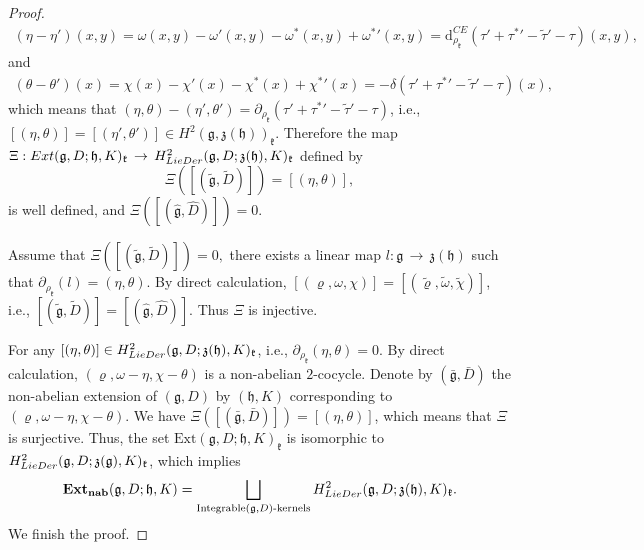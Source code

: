 \documentclass[10pt,a4paper]{amsart}
\newcommand {\emptycomment}[1]{}
\newcommand{\LD}{{\rm LieDer }}
\newcommand{\dM}{\mathrm{d}}
\newcommand{\frkk}{\mathfrak k}
\newcommand{\frkz}{\mathfrak z}
\newcommand{\g}{\mathfrak g}
\newcommand{\h}{\mathfrak h}
\newcommand{\lon }{\,\rightarrow\,}
\begin{document}
\begin{proof}
\begin{eqnarray*}
(\eta-\eta')(x, y)=\omega(x, y)-\omega'(x, y)-\omega^{*}(x, y)+\omega^{*}{'}(x, y) =\dM^{CE}_{\rho_\frkk}(\tau'+\tau^{*}{'}-\tilde{\tau}{'}-\tau)(x, y),
\end{eqnarray*}
and 
\begin{eqnarray*}
(\theta-\theta')(x)=\chi(x)-\chi'(x)-\chi^*(x)+\chi^{*}{'}(x)=-\delta(\tau'+\tau^{*}{'}-\tilde{\tau}'-\tau)(x),
\end{eqnarray*}
which means that $(\eta, \theta)-(\eta', \theta')=\partial_{\rho_{\frkk}}(\tau'+\tau^{*}{'}-\tilde{\tau}'-\tau)$, i.e.,$[(\eta, \theta)]=[(\eta', \theta')]\in H^{2}(\g, \frkz(\h))_{\frkk}$. Therefore the map  
$\Xi:{\rm Ext}(\g,D; \h, K)_\frkk\lon H_{\LD}^{2}(\g,D; \frkz(\h),K)_\frkk$ defined by
$$
\Xi([(\tilde{\g}, \tilde{D})])=[(\eta, \theta)], 
$$
is well defined, and $\Xi([(\hat{\g}, \hat{D})])=0$.

Assume that $\Xi([(\tilde{\g}, \tilde{D})])=0,$ there exists a linear map $l:\g\lon\frkz(\h)$ such that $\partial_{\rho_{\frkk}}(l)=(\eta, \theta)$. By direct calculation, 
\emptycomment{
	Then
\begin{eqnarray*}
\left\{\begin{array}{rcl}
\varrho(x)u-\tilde{\varrho}(x)u&=&[\tau(x)+l(x), u]_\h,\\
\omega(x, y)-\tilde{\omega}(x, y)&=&\tilde{\varrho}(x)(\tau+l)(y)-\tilde{\varrho}(y)(\tau+l)(x)+[(\tau+l)(x), (\tau+l)(y)]_\h-(l+\tau)([x, y]_\g),\\
\chi(x)-\tilde{\chi}(x)&=&K((\tau+l)(x))-(\tau+l)(D(x)),
\end{array}\right.
\end{eqnarray*}
which means that }$[(\varrho, \omega, \chi)]=[(\tilde{\varrho}, \tilde{\omega}, \tilde{\chi})]$, i.e., $[(\tilde{\g}, \tilde{D})]=[(\hat{\g}, \hat{D})]$. Thus $\Xi$ is injective. 

For any $[(\eta, \theta)]\in H^2_{\LD}(\g,D; \frkz(\h),K)_\frkk$, i.e., $\partial_{\rho_\frkk}(\eta, \theta)=0$. By direct calculation, $(\varrho, \omega-\eta, \chi-\theta)$ is a non-abelian $2$-cocycle. Denote by $(\bar{\g}, \bar{D})$ the non-abelian extension of $(\g, D)$ by $(\h, K)$ corresponding to $(\varrho, \omega-\eta, \chi-\theta)$. We have $\Xi([(\bar{\g}, \bar{D})])=[(\eta, \theta)]$, which means that $\Xi$ is surjective. Thus,
the set $\mathrm{Ext}(\g,D;\h,K)_{\frkk}$ is isomorphic to $H^2_{\LD}(\g,D;\frkz(\g),K)_{\frkk}$, which implies 
\begin{equation*}
      {\rm{\bf Ext_{nab}}}(\g,D;\h,K)=\bigsqcup_{\text{Integrable}(\g,D)\text{-kernels}}H^2_{\LD}(\g,D;\frkz(\h),K)_{\frkk}.
    \end{equation*}
We finish the proof.
    \end{proof}
\end{document}
